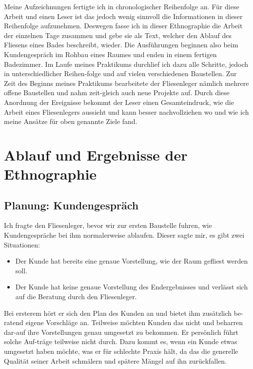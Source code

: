 Meine Aufzeichnungen fertigte ich in chronologischer Reihenfolge an. Für diese Arbeit und einen Leser ist das jedoch wenig sinnvoll die Informationen in dieser Reihenfolge aufzunehmen. Deswegen fasse ich in dieser Ethnographie die Arbeit der einzelnen Tage zusammen und gebe sie als Text, welcher den Ablauf des Fliesens eines Bades beschreibt, wieder. Die Ausführungen beginnen also beim Kundengespräch im Rohbau eines Raumes und enden in einem fertigen Badezimmer. Im Laufe meines Praktikums durchlief ich dazu alle Schritte, jedoch in unterschiedlicher Reihen-folge und auf vielen verschiedenen Baustellen. Zur Zeit des Beginns meines Praktikums bearbeitete der Fliesenleger nämlich mehrere offene Baustellen und nahm zeit-gleich auch neue Projekte auf. Durch diese Anordnung der Ereignisse bekommt der Leser einen Gesamteindruck, wie die Arbeit eines Fliesenlegers aussieht und kann besser nachvollziehen wo und wie ich meine Ansätze für oben genannte Ziele fand.

\section{Ablauf und Ergebnisse der Ethnographie}

\subsection{Planung: Kundengespräch}

Ich fragte den Fliesenleger, bevor wir zur ersten Baustelle fuhren, wie Kundengespräche bei ihm normalerweise ablaufen. Dieser sagte mir, es gibt zwei Situationen:

\begin{itemize}
	\item Der Kunde hat bereits eine genaue Vorstellung, wie der Raum gefliest werden soll.
	\item Der Kunde hat keine genaue Vorstellung des Endergebnisses und verlässt sich auf die Beratung durch den Fliesenleger.
\end{itemize}

Bei ersterem hört er sich den Plan des Kunden an und bietet ihm zusätzlich be-ratend eigene Vorschläge an. Teilweise möchten Kunden das nicht und beharren dar-auf ihre Vorstellungen genau umgesetzt zu bekommen. Er persönlich führt solche Auf-träge teilweise nicht durch. Dazu kommt es, wenn ein Kunde etwas umgesetzt haben möchte, was er für schlechte Praxis hält, da das die generelle Qualität seiner Arbeit schmälern und spätere Mängel auf ihn zurückfallen. 

